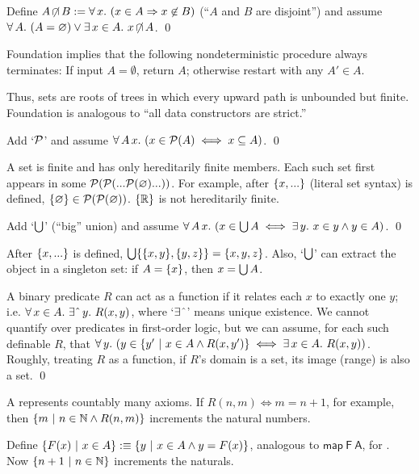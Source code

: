 \begin{axiom}[foundation]
\label{axm:founcation}
Define $A \operatorname{\mbox{$\not\mspace{-5mu}\cap$}} B := \forall\,{x}\ldotp\,{(x \in A \Rightarrow x \not\in B)}$ (``$A$ and $B$ are disjoint'') and assume $\forall\,{A}\ldotp\,{(A = \varnothing) \vee \exists\,{x \in A}\ldotp\,{x \operatorname{\mbox{$\not\mspace{-5mu}\cap$}} A}}$.
\qed
\end{axiom}
Foundation implies that the following nondeterministic procedure always terminates: If input $A = \emptyset$, return $A$; otherwise restart with any $A' \in A$.

Thus, sets are roots of trees in which every upward path is unbounded but finite. Foundation is analogous to ``all data constructors are strict.''
\begin{axiom}[powerset]
\label{axm:powerset}
Add `$\mathcal{P}$' and assume $\forall\,{A\,x}\ldotp\,(x \in \mathcal{P}(A) \iff x \subseteq A)$.
\qed
\end{axiom}
A  set is finite and has only hereditarily finite members.
Each such set first appears in some $\mathcal{P}(\mathcal{P}(...\mathcal{P}(\varnothing)...))$.
For example, after $\{{x,...}\}$ (literal set syntax) is defined, $\{{\varnothing}\} \in \mathcal{P}(\mathcal{P}(\varnothing))$. $\{{\mathbb{R}}\}$ is not hereditarily finite.
\begin{axiom}[union]
\label{axm:union}
Add `$\textstyle\bigcup$' (``big'' union) and assume $\forall\,{A\,x}\ldotp\,( x \in \textstyle\bigcup A \iff \exists\,{y}\ldotp\, x \in y \wedge y \in A)$.
\qed
\end{axiom}
After $\{{x,...}\}$ is defined, $\textstyle\bigcup \{{\{{x,y}\},\{{y,z}\}}\} = \{{x,y,z}\}$. Also, `$\textstyle\bigcup$' can extract the object in a singleton set: if $A = \{{x}\}$, then $x = \textstyle\bigcup A$.
\begin{axiom}
\label{axm:replacement}
A binary predicate $R$ can act as a function if it relates each $x$ to exactly one $y$; i.e. $\Forall{x \in A}{\ExistsOne{y}{R(x,y)}}$, where `$\exists\char`\^$' means unique existence. We cannot quantify over predicates in first-order logic, but we can assume, for each such definable $R$, that $\forall\,{y}\ldotp\, (y \in \lbrace {y'} \ \lvert\ {x \in A \wedge R(x,y')} \rbrace \iff \exists\,{x \in A}\ldotp\, R(x,y))$. Roughly, treating $R$ as a function, if $R$'s domain is a set, its image (range) is also a set.
\qed
\end{axiom}
A  represents countably many axioms. If $R(n,m) \iff m = n+1$, for example, then $\lbrace {m} \ \lvert\ {n \in \mathbb{N} \wedge R(n,m)} \rbrace$ increments the natural numbers.

Define  $\lbrace {F(x)} \ \lvert\ {x \in A} \rbrace :\equiv \lbrace {y} \ \lvert\ {x \in A \wedge y = F(x)} \rbrace$, analogous to $\mathsf{map~F~A}$, for . Now $\lbrace {n + 1} \ \lvert\ {n \in \mathbb{N}} \rbrace$ increments the naturals.


